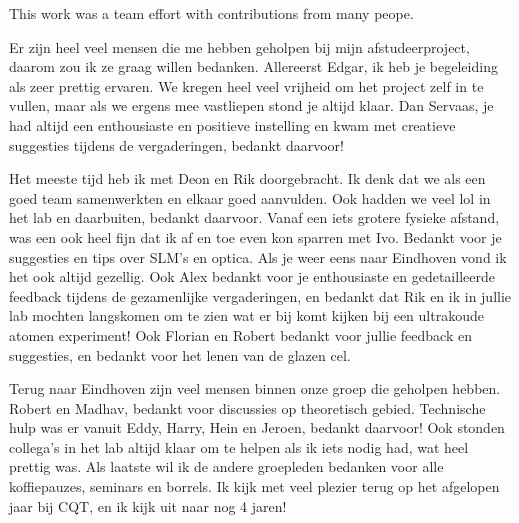 This work was a team effort with contributions from many peope. 

Er zijn heel veel mensen die me hebben geholpen bij mijn afstudeerproject, daarom zou ik ze graag willen bedanken. 
Allereerst Edgar, ik heb je begeleiding als zeer prettig ervaren. 
We kregen heel veel vrijheid om het project zelf in te vullen, maar als we ergens mee vastliepen stond je altijd klaar.
Dan Servaas, je had altijd een enthousiaste en positieve instelling en kwam met creatieve suggesties tijdens de vergaderingen, bedankt daarvoor!

Het meeste tijd heb ik met Deon en Rik doorgebracht. 
Ik denk dat we als een goed team samenwerkten en elkaar goed aanvulden.
Ook hadden we veel lol in het lab en daarbuiten, bedankt daarvoor. 
Vanaf een iets grotere fysieke afstand, was een ook heel fijn dat ik af en toe even kon sparren met Ivo. 
Bedankt voor je suggesties en tips over SLM's en optica. Als je weer eens naar Eindhoven vond ik het ook altijd gezellig.
Ook Alex bedankt voor je enthousiaste en gedetailleerde feedback tijdens de gezamenlijke vergaderingen, en bedankt dat Rik en ik in jullie lab mochten langskomen om te zien wat er bij komt kijken bij een ultrakoude atomen experiment!
Ook Florian en Robert bedankt voor jullie feedback en suggesties, en bedankt voor het lenen van de glazen cel.

Terug naar Eindhoven zijn veel mensen binnen onze groep die geholpen hebben. 
Robert en Madhav, bedankt voor discussies op theoretisch gebied. 
Technische hulp was er vanuit Eddy, Harry, Hein en Jeroen, bedankt daarvoor! 
Ook stonden collega's in het lab altijd klaar om te helpen als ik iets nodig had, wat heel prettig was.
Als laatste wil ik de andere groepleden bedanken voor alle koffiepauzes, seminars en borrels. 
Ik kijk met veel plezier terug op het afgelopen jaar bij CQT, en ik kijk uit naar nog 4 jaren!